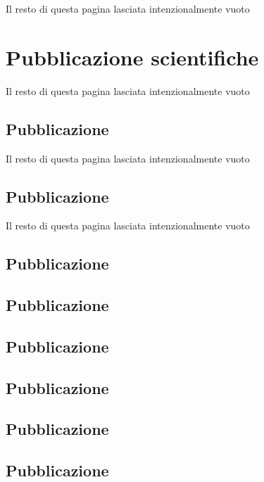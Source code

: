 \documentclass{article}
\def\lb{\vfill{Il resto di questa pagina lasciata intenzionalmente vuoto}\vfill}
\begin{document}
\lb





\center \section{Pubblicazione scientifiche}
\lb

\newpage

\center \subsection{Pubblicazione} 
 \lb 




\center \subsection{Pubblicazione}
 \lb
\newpage


\center \subsection{Pubblicazione}
\newpage


\center \subsection{Pubblicazione}
\newpage


\center \subsection{Pubblicazione}
\newpage


\center \subsection{Pubblicazione}
\newpage


\center \subsection{Pubblicazione}
\newpage


\center \subsection{Pubblicazione}
\newpage

\end{document}
